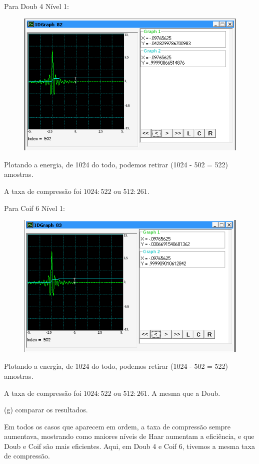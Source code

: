 \documentclass[10pt]{article}
\begin{document}
Para Doub 4 Nível 1:
\begin{figure}[h]
    \includegraphics[scale=0.5]{doub1.png}
    \centering
    \caption{}
\end{figure}

Plotando a energia, de 1024 do todo, podemos retirar (1024 - 502 = 522) amostras.

A taxa de compressão foi $1024:522$ ou $512:261$.

Para Coif 6 Nível 1:
\begin{figure}[h]
    \includegraphics[scale=0.5]{coif 1.png}
    \centering
    \caption{}
\end{figure}

Plotando a energia, de 1024 do todo, podemos retirar (1024 - 502 = 522) amostras.

A taxa de compressão foi $1024:522$ ou $512:261$. A mesma que a Doub.

(g) comparar os resultados.

Em todos os casos que aparecem em ordem, a taxa de compressão sempre aumentava, mostrando como maiores níveis de Haar aumentam a eficiência, e que Doub e Coif são mais eficientes. Aqui, em Doub 4 e Coif 6, tivemos a mesma taxa de compressão.
\end{document}
